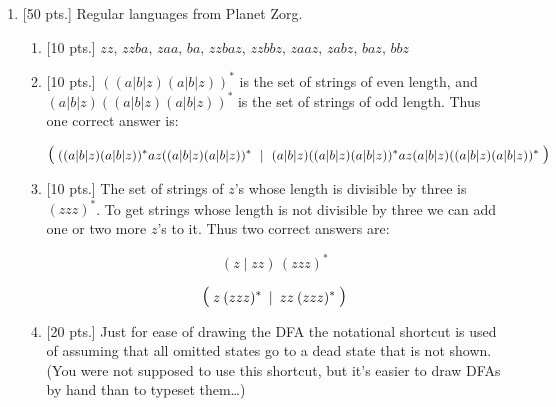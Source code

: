 \documentclass[11pt]{article}
\begin{document}
\begin{enumerate}
\begin{enumerate}
          \end{enumerate}

    \item {[50 pts.]} Regular languages from Planet Zorg.

          \vspace{-2mm}

          \begin{enumerate}

            \addtolength{\itemsep}{2.5mm}

            \item {{[10 pts.]}}
                  \(
                    zz, \, zzba, \, zaa, \, ba, \, zzbaz, \, zzbbz, \, zaaz,
                    \, zabz, \, baz, \, bbz
                  \)

            \item {{[10 pts.]}} $((a|b|z)(a|b|z))^*$ is the set of strings
                  of even length, and $(a|b|z)((a|b|z)(a|b|z))^*$ is the set
                  of strings of odd length.  Thus one correct answer is:

                  \begin{displaymath}
                    \mbox{\Large \ensuremath{(}} \:
                      ((a|b|z)(a|b|z))^*az((a|b|z)(a|b|z))^* \ \mid \
                      (a|b|z)((a|b|z)(a|b|z))^*az(a|b|z)((a|b|z)(a|b|z))^* \:
                    \mbox{\Large \ensuremath{)}}
                  \end{displaymath}

            \item {{[10 pts.]}} The set of strings of $z$'s whose length is
                  divisible by three is $(zzz)^*$.  To get strings whose
                  length is not divisible by three we can add one or two
                  more $z$'s to it.  Thus two correct answers are:

                  \begin{displaymath}
                    (z \! \mid \! zz) \, (zzz)^*
                  \end{displaymath}

                  \vspace{-5mm}

                  \begin{displaymath}
                    \mbox{\Large \ensuremath{(}} \: z \: (zzz)^* \: \mid \: zz \: (zzz)^* \: \mbox{\Large \ensuremath{)}}
                  \end{displaymath}

            \item {{[20 pts.]}} Just for ease of drawing the DFA the
                  notational shortcut is used of assuming that all omitted
                  states go to a dead state that is not shown.  (You were
                  not supposed to use this shortcut, but it's easier to draw
                  DFAs by hand than to typeset them\ldots)


\end{enumerate}
\end{enumerate}
\end{document}
